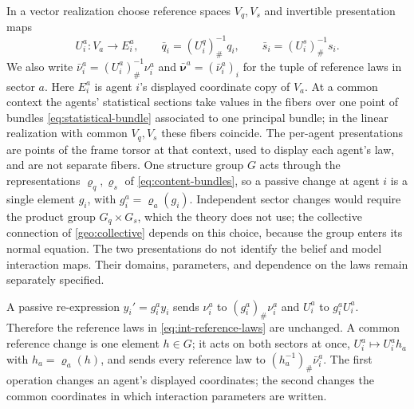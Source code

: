 In a vector realization choose reference spaces $V_q,V_s$ and invertible presentation maps
\begin{equation}
U_i^a:V_a\longrightarrow E_i^a,\qquad
\bar q_i=(U_i^q)^{-1}_\#q_i,\qquad
\bar s_i=(U_i^s)^{-1}_\#s_i.
\label{eq:int-reference-laws}
\end{equation}
We also write $\bar\nu_i^a=(U_i^a)^{-1}_\#\nu_i^a$ and $\bar{\boldsymbol\nu}^a=(\bar\nu_i^a)_i$ for the tuple of reference laws in sector $a$. Here $E_i^a$ is agent $i$'s displayed coordinate copy of $V_a$. At a common context the agents' statistical sections take values in the fibers over one point of bundles \cref{eq:statistical-bundle} associated to one principal bundle; in the linear realization with common $V_q,V_s$ these fibers coincide. The per-agent presentations are points of the frame torsor at that context, used to display each agent's law, and are not separate fibers. One structure group $G$ acts through the representations $\varrho_q,\varrho_s$ of \cref{eq:content-bundles}, so a passive change at agent $i$ is a single element $g_i$, with $g_i^a=\varrho_a(g_i)$. Independent sector changes would require the product group $G_q\times G_s$, which the theory does not use; the collective connection of \cref{geo:collective} depends on this choice, because the group enters its normal equation. The two presentations do not identify the belief and model interaction maps. Their domains, parameters, and dependence on the laws remain separately specified.

A passive re-expression $y_i'=g_i^a y_i$ sends $\nu_i^a$ to $(g_i^a)_\#\nu_i^a$ and $U_i^a$ to $g_i^aU_i^a$. Therefore the reference laws in \cref{eq:int-reference-laws} are unchanged. A common reference change is one element $h\in G$; it acts on both sectors at once, $U_i^a\mapsto U_i^a h_a$ with $h_a=\varrho_a(h)$, and sends every reference law to $(h_a^{-1})_\#\bar\nu_i^a$. The first operation changes an agent's displayed coordinates; the second changes the common coordinates in which interaction parameters are written.

